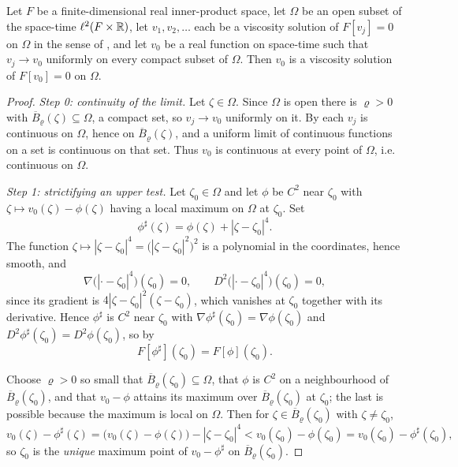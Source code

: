 \begin{lemma}
Let $F$ be a finite-dimensional real inner-product space, let $\Omega$ be an
open subset of the space-time $\ell^2(F\times\mathbb{R})$, let $v_1,v_2,\ldots$ each be a
viscosity solution of $F[v_j]=0$ on $\Omega$ in the sense of
, and let $v_0$ be a real function on space-time such
that $v_j\to v_0$ uniformly on every compact subset of $\Omega$. Then $v_0$ is a
viscosity solution of $F[v_0]=0$ on $\Omega$.
\end{lemma}
\begin{proof}
\emph{Step 0: continuity of the limit.}
Let $\zeta\in\Omega$. Since $\Omega$ is open there is $\varrho>0$ with
$\overline B_\varrho(\zeta)\subseteq\Omega$, a compact set, so $v_j\to v_0$
uniformly on it. By  each $v_j$ is continuous on
$\Omega$, hence on $\overline B_\varrho(\zeta)$, and a uniform limit of
continuous functions on a set is continuous on that set. Thus $v_0$ is
continuous at every point of $\Omega$, i.e. continuous on $\Omega$.

\emph{Step 1: strictifying an upper test.}
Let $\zeta_0\in\Omega$ and let $\phi$ be $C^2$ near $\zeta_0$ with
$\zeta\mapsto v_0(\zeta)-\phi(\zeta)$ having a local maximum on $\Omega$ at
$\zeta_0$. Set
\[
  \phi^\sharp(\zeta)=\phi(\zeta)+|\zeta-\zeta_0|^4 .
\]
The function $\zeta\mapsto|\zeta-\zeta_0|^4=\bigl(|\zeta-\zeta_0|^2\bigr)^2$ is a
polynomial in the coordinates, hence smooth, and
\begin{equation}\label{eq:ls-fourth}
  \nabla\bigl(|\cdot-\zeta_0|^4\bigr)(\zeta_0)=0,
  \qquad
  D^2\bigl(|\cdot-\zeta_0|^4\bigr)(\zeta_0)=0 ,
\end{equation}
since its gradient is $4|\zeta-\zeta_0|^2(\zeta-\zeta_0)$, which vanishes at
$\zeta_0$ together with its derivative. Hence $\phi^\sharp$ is $C^2$ near
$\zeta_0$ with $\nabla\phi^\sharp(\zeta_0)=\nabla\phi(\zeta_0)$ and
$D^2\phi^\sharp(\zeta_0)=D^2\phi(\zeta_0)$, so by 
\begin{equation}\label{eq:ls-same-jet}
  F[\phi^\sharp](\zeta_0)=F[\phi](\zeta_0).
\end{equation}

Choose $\varrho>0$ so small that $\overline B_\varrho(\zeta_0)\subseteq\Omega$,
that $\phi$ is $C^2$ on a neighbourhood of $\overline B_\varrho(\zeta_0)$, and
that $v_0-\phi$ attains its maximum over $\overline B_\varrho(\zeta_0)$ at
$\zeta_0$; the last is possible because the maximum is local on $\Omega$. Then
for $\zeta\in\overline B_\varrho(\zeta_0)$ with $\zeta\ne\zeta_0$,
\[
  v_0(\zeta)-\phi^\sharp(\zeta)
   =\bigl(v_0(\zeta)-\phi(\zeta)\bigr)-|\zeta-\zeta_0|^4
   <v_0(\zeta_0)-\phi(\zeta_0)=v_0(\zeta_0)-\phi^\sharp(\zeta_0),
\]
so $\zeta_0$ is the \emph{unique} maximum point of $v_0-\phi^\sharp$ on
$\overline B_\varrho(\zeta_0)$.


\end{proof}
